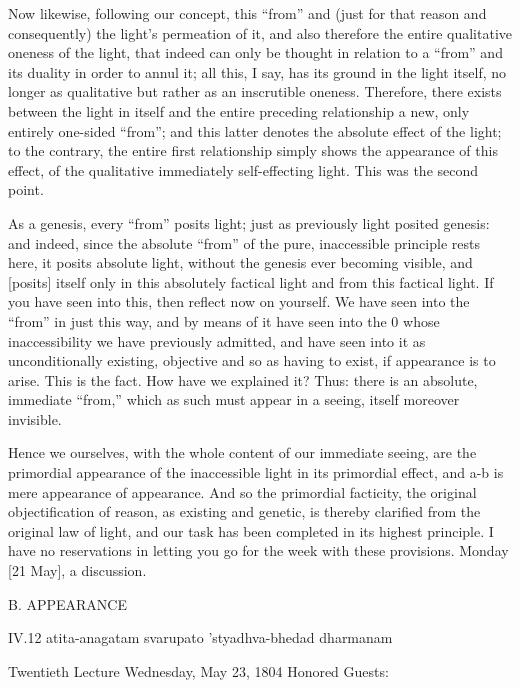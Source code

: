 Now likewise, following our concept,
this “from” and (just for that reason and consequently)
the light's permeation of it,
and also therefore the entire
qualitative oneness of the light,
that indeed can only be thought in relation to
a “from” and its duality in order to annul it;
all this, I say, has its ground in the light itself,
no longer as qualitative but rather as an inscrutible oneness.
Therefore, there exists between the light in itself and
the entire preceding relationship
a new, only entirely one-sided “from”;
and this latter denotes the absolute effect of the light;
to the contrary, the entire first relationship simply shows
the appearance of this effect,
of the qualitative immediately self-effecting light.
This was the second point.

As a genesis, every “from” posits light;
just as previously light posited genesis:
and indeed, since the absolute “from” of
the pure, inaccessible principle rests here,
it posits absolute light,
without the genesis ever becoming visible,
and [posits] itself only
in this absolutely factical light
and from this factical light.
If you have seen into this,
then reflect now on yourself.
We have seen into the “from” in just this way,
and by means of it have seen into the 0
whose inaccessibility we have previously admitted,
and have seen into it as unconditionally existing,
objective and so as having to exist,
if appearance is to arise.
This is the fact.
How have we explained it?
Thus: there is an absolute, immediate “from,”
which as such must appear in a seeing,
itself moreover invisible.

Hence we ourselves,
with the whole content
of our immediate seeing,
are the primordial appearance
of the inaccessible light
in its primordial effect,
and a-b is mere appearance of appearance.
And so the primordial facticity,
the original objectification of reason,
as existing and genetic, is thereby clarified
from the original law of light,
and our task has been completed
in its highest principle.
I have no reservations in letting you go
for the week with these provisions.
Monday [21 May], a discussion.

B. APPEARANCE

IV.12
atita-anagatam svarupato 'styadhva-bhedad dharmanam

Twentieth Lecture
Wednesday, May 23, 1804
Honored Guests:

